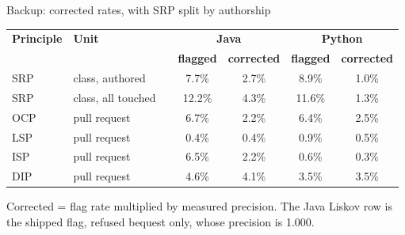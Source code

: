 \documentclass[11pt,aspectratio=169]{beamer}
\begin{document}
\begin{frame}{Backup: corrected rates, with SRP split by authorship}
\centering
\footnotesize
\begin{tabular}{@{}lllcc|cc@{}}
\toprule
\textbf{Principle} & \textbf{Unit} & & \multicolumn{2}{c|}{\textbf{Java}} & \multicolumn{2}{c}{\textbf{Python}} \\
 & & & \textbf{flagged} & \textbf{corrected} & \textbf{flagged} & \textbf{corrected} \\
\midrule
SRP & class, authored & & 7.7\% & 2.7\% & 8.9\% & 1.0\% \\
SRP & class, all touched & & 12.2\% & 4.3\% & 11.6\% & 1.3\% \\
OCP & pull request & & 6.7\% & 2.2\% & 6.4\% & 2.5\% \\
LSP & pull request & & 0.4\% & 0.4\% & 0.9\% & 0.5\% \\
ISP & pull request & & 6.5\% & 2.2\% & 0.6\% & 0.3\% \\
DIP & pull request & & 4.6\% & 4.1\% & 3.5\% & 3.5\% \\
\bottomrule
\end{tabular}
\vspace{6pt}
{\small Corrected = flag rate multiplied by measured precision. The Java Liskov row is the shipped
flag, refused bequest only, whose precision is 1.000.}
\end{frame}
\end{document}
